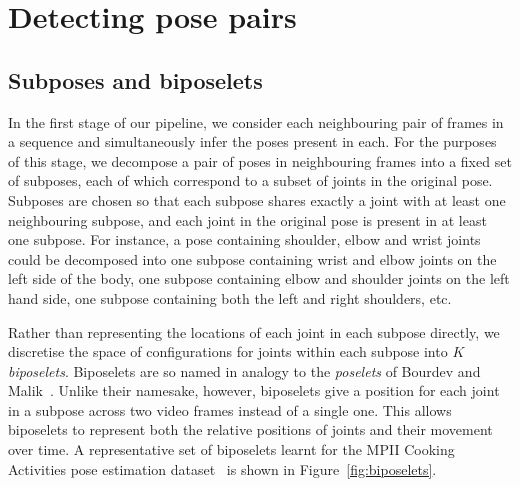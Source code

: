 \documentclass[runningheads]{llncs}
\begin{document}
\section{Detecting pose pairs}

\subsection{Subposes and biposelets}\label{sec:decomp}

In the first stage of our pipeline, we consider each neighbouring pair of frames
in a sequence and simultaneously infer the poses present in each. For the
purposes of this stage, we decompose a pair of poses in neighbouring frames into
a fixed set of subposes, each of which correspond to a subset of joints in the
original pose. Subposes are chosen so that each subpose shares exactly a joint
with at least one neighbouring subpose, and each joint in the original pose is
present in at least one subpose. For instance, a pose containing shoulder, elbow
and wrist joints could be decomposed into one subpose containing wrist and elbow
joints on the left side of the body, one subpose containing elbow and shoulder
joints on the left hand side, one subpose containing both the left and right
shoulders, etc.

Rather than representing the locations of each joint in each subpose directly,
we discretise the space of configurations for joints within each subpose into
$K$ \textit{biposelets}. Biposelets are so named in analogy to the
\textit{poselets} of Bourdev and Malik~\cite{bourdev2009poselets}. Unlike their
namesake, however, biposelets give a position for each joint in a subpose across
two video frames instead of a single one. This allows biposelets to represent
both the relative positions of joints and their movement over time. A
representative set of biposelets learnt for the MPII Cooking Activities pose
estimation dataset~\cite{rohrbach2012database} is shown in
Figure~\ref{fig:biposelets}.
\end{document}
